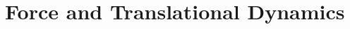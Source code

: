 \documentclass[../mech.tex]{subfiles}
\begin{document}
\chapter{Force and Translational Dynamics}
\end{document}
